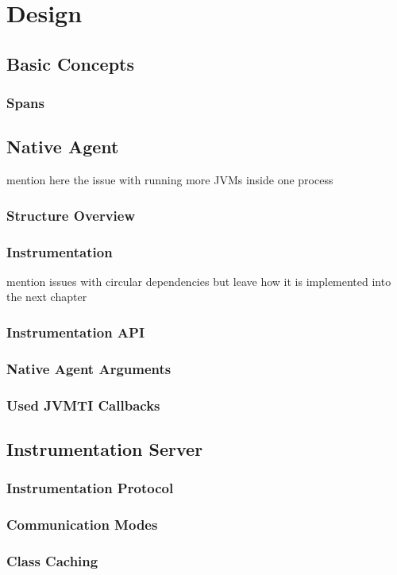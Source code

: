 \chapter{Design}
\label{chap:design}
\section{Basic Concepts}
\subsection{Spans}
\label{subsec:spans}
\section{Native Agent}
mention here the issue with running more JVMs inside one process
\subsection{Structure Overview}
\subsection{Instrumentation}
mention issues with circular dependencies but leave how it is implemented into the next chapter
\subsection{Instrumentation API}
\subsection{Native Agent Arguments}
\subsection{Used JVMTI Callbacks}
\section{Instrumentation Server}
\subsection{Instrumentation Protocol }
\subsection{Communication Modes}
\subsection{Class Caching}
